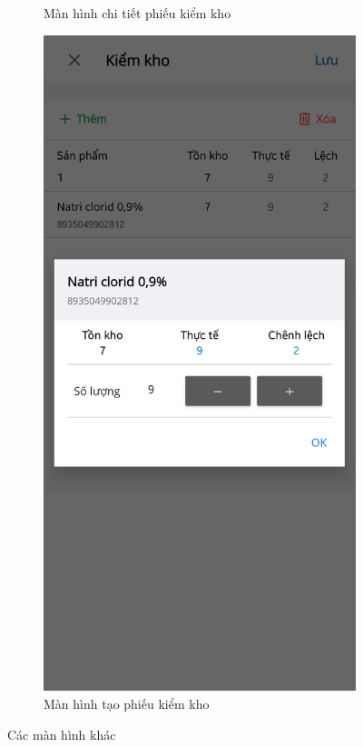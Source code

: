 \documentclass[../DoAn.tex]{subfiles}
\begin{document}
\begin{figure}[H]
\begin{subfigure}{0.49\linewidth}
        \caption{Màn hình chi tiết phiếu kiểm kho}
        \label{figure:screen-auditreportdetailspage}
    \end{subfigure}
    \begin{subfigure}{0.5\linewidth}
        \centering
        \includegraphics[width=0.9\linewidth]{Hinhve/design/screens/AuditReportCreatePage}
        \caption{Màn hình tạo phiếu kiểm kho}
        \label{figure:screen-auditreportcreatepage}
    \end{subfigure}
    \caption{Các màn hình khác}
    \label{figure:screen-variouspages2}
\end{figure}
\break
\end{document}
